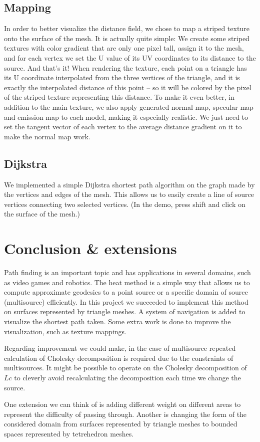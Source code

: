 \documentclass[a4paper,12pt,twoside]{article}
\begin{document}
\subsection{Mapping}

In order to better visualize the distance field, we chose to map a striped texture onto the surface of the mesh. It is actually quite simple: We create some striped textures with color gradient that are only one pixel tall, assign it to the mesh, and for each vertex we set the U value of its UV coordinates to its distance to the source. And that’s it! When rendering the texture, each point on a triangle has its U coordinate interpolated from the three vertices of the triangle, and it is exactly the interpolated distance of this point – so it will be colored by the pixel of the striped texture representing this distance.
To make it even better, in addition to the main texture, we also apply generated normal map, specular map and emission map to each model, making it especially realistic. We just need to set the tangent vector of each vertex to the average distance gradient on it to make the normal map work.


\subsection{Dijkstra}
We implemented a simple Dijkstra shortest path algorithm on the graph made by the vertices and edges of the mesh. This allows us to easily create a line of source vertices connecting two selected vertices. (In the demo, press shift and click on the surface of the mesh.)


\section{Conclusion \& extensions}
Path finding is an important topic and has applications in several domains, such as video games and robotics. The heat method is a simple way that allows us to compute approximate geodesics to a point source or a specific domain of source (multisource) efficiently. In this project we succeeded to implement this method on surfaces represented by triangle meshes. A system of navigation is added to visualize the shortest path taken. Some extra work is done to improve the visualization, such as texture mappings.

Regarding improvement we could make, in the case of multisource repeated calculation of Cholesky decomposition is required due to the constraints of multisources. It might be possible to operate on the Cholesky decomposition of $Lc$ to cleverly avoid recalculating the decomposition each time we change the source.

One extension we can think of is adding different weight on different areas to represent the difficulty of passing through. Another is changing the form of the considered domain from surfaces represented by triangle meshes to bounded spaces represented by tetrehedron meshes.
\end{document}
